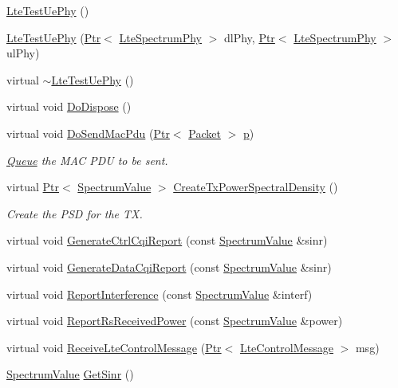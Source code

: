\begin{DoxyCompactItemize}
\item 
\hyperlink{classns3_1_1LteTestUePhy_afefafc7d03b06b88a39a2fda267494bb}{Lte\+Test\+Ue\+Phy} ()
\item 
\hyperlink{classns3_1_1LteTestUePhy_af79e96d50d1af02eba7bb222119f817a}{Lte\+Test\+Ue\+Phy} (\hyperlink{classns3_1_1Ptr}{Ptr}$<$ \hyperlink{classns3_1_1LteSpectrumPhy}{Lte\+Spectrum\+Phy} $>$ dl\+Phy, \hyperlink{classns3_1_1Ptr}{Ptr}$<$ \hyperlink{classns3_1_1LteSpectrumPhy}{Lte\+Spectrum\+Phy} $>$ ul\+Phy)
\item 
virtual \hyperlink{classns3_1_1LteTestUePhy_a99b5ec3f7256d9a7b3662db7e9ea577d}{$\sim$\+Lte\+Test\+Ue\+Phy} ()
\item 
virtual void \hyperlink{classns3_1_1LteTestUePhy_a5129070180d59a1ee4278d9749fa97b0}{Do\+Dispose} ()
\item 
virtual void \hyperlink{classns3_1_1LteTestUePhy_a9680222e996c4e7809345f085fcd5233}{Do\+Send\+Mac\+Pdu} (\hyperlink{classns3_1_1Ptr}{Ptr}$<$ \hyperlink{classns3_1_1Packet}{Packet} $>$ \hyperlink{lte__link__budget__x2__handover__measures_8m_ac9de518908a968428863f829398a4e62}{p})
\begin{DoxyCompactList}\small\item\em \hyperlink{classns3_1_1Queue}{Queue} the M\+AC P\+DU to be sent. \end{DoxyCompactList}\item 
virtual \hyperlink{classns3_1_1Ptr}{Ptr}$<$ \hyperlink{classns3_1_1SpectrumValue}{Spectrum\+Value} $>$ \hyperlink{classns3_1_1LteTestUePhy_a536d983a450ab82cb7de3f68fcd45789}{Create\+Tx\+Power\+Spectral\+Density} ()
\begin{DoxyCompactList}\small\item\em Create the P\+SD for the TX. \end{DoxyCompactList}\item 
virtual void \hyperlink{classns3_1_1LteTestUePhy_a47af4e6ac19044b7c97e8520ba7d27d3}{Generate\+Ctrl\+Cqi\+Report} (const \hyperlink{classns3_1_1SpectrumValue}{Spectrum\+Value} \&sinr)
\item 
virtual void \hyperlink{classns3_1_1LteTestUePhy_a6a2287b209a020b8ccfd4adf1940e4b0}{Generate\+Data\+Cqi\+Report} (const \hyperlink{classns3_1_1SpectrumValue}{Spectrum\+Value} \&sinr)
\item 
virtual void \hyperlink{classns3_1_1LteTestUePhy_ab2da9e010a9fe787e73703e542ceb424}{Report\+Interference} (const \hyperlink{classns3_1_1SpectrumValue}{Spectrum\+Value} \&interf)
\item 
virtual void \hyperlink{classns3_1_1LteTestUePhy_ae64c9632291295763434efc43e7d6534}{Report\+Rs\+Received\+Power} (const \hyperlink{classns3_1_1SpectrumValue}{Spectrum\+Value} \&power)
\item 
virtual void \hyperlink{classns3_1_1LteTestUePhy_aa20688bcc60ad58070da351f28a7daf5}{Receive\+Lte\+Control\+Message} (\hyperlink{classns3_1_1Ptr}{Ptr}$<$ \hyperlink{classns3_1_1LteControlMessage}{Lte\+Control\+Message} $>$ msg)
\item 
\hyperlink{classns3_1_1SpectrumValue}{Spectrum\+Value} \hyperlink{classns3_1_1LteTestUePhy_af887e496d2938edecccd0f26de7279f7}{Get\+Sinr} ()
\end{DoxyCompactItemize}
